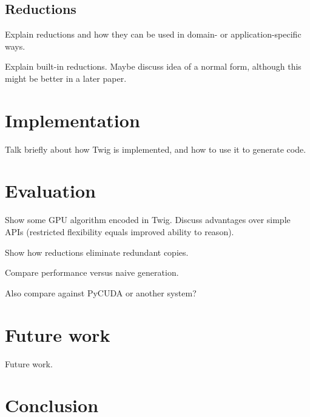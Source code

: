 \documentclass[11pt]{article}
\begin{document}
\subsection{Reductions}

Explain reductions and how they can be used in domain- or application-specific
ways.

Explain built-in reductions. Maybe discuss idea of a normal form, although
this might be better in a later paper.

\section{Implementation}

Talk briefly about how Twig is implemented, and how to use it to generate
code.

\section{Evaluation}

Show some GPU algorithm encoded in Twig. Discuss advantages over simple APIs
(restricted flexibility equals improved ability to reason).

Show how reductions eliminate redundant copies.

Compare performance versus naive generation.

Also compare against PyCUDA or another system?

\section{Future work}

Future work.

\section{Conclusion}


% 

% 
% 
\end{document}
